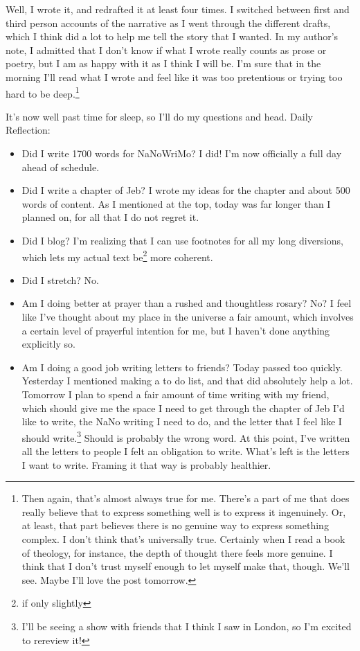 \documentclass[12pt]{article}[titlepage]
\newcommand{\1}{\={a}}
\newcommand{\2}{\={e}}
\newcommand{\3}{\={\i}}
\newcommand{\4}{\=o}
\newcommand{\5}{\=u}
\newcommand{\6}{\={A}}
\renewcommand{\,}{\textsuperscript{,}}
\begin{document}
Well, I wrote it, and redrafted it at least four times.
I switched between first and third person accounts of the narrative as I went through the different drafts, which I think did a lot to help me tell the story that I wanted.
In my author's note, I admitted that I don't know if what I wrote really counts as prose or poetry, but I am as happy with it as I think I will be.
I'm sure that in the morning I'll read what I wrote and feel like it was too pretentious or trying too hard to be deep.\footnote{Then again, that's almost always true for me.
There's a part of me that does really believe that to express something well is to express it ingenuinely.
Or, at least, that part believes there is no genuine way to express something complex.
I don't think that's universally true.
Certainly when I read a book of theology, for instance, the depth of thought there feels more genuine.
I think that I don't trust myself enough to let myself make that, though.
We'll see.
Maybe I'll love the post tomorrow.}

It's now well past time for sleep, so I'll do my questions and head.
Daily Reflection:
\begin{itemize}
\item Did I write 1700 words for NaNoWriMo? I did! I'm now officially a full day ahead of schedule.
\item Did I write a chapter of Jeb? I wrote my ideas for the chapter and about 500 words of content. As I mentioned at the top, today was far longer than I planned on, for all that I do not regret it.
\item Did I blog? I'm realizing that I can use footnotes for all my long diversions, which lets my actual text be\footnote{if only slightly} more coherent.
\item Did I stretch? No.
\item Am I doing better at prayer than a rushed and thoughtless rosary? No? I feel like I've thought about my place in the universe a fair amount, which involves a certain level of prayerful intention for me, but I haven't done anything explicitly so.
\item Am I doing a good job writing letters to friends? Today passed too quickly. Yesterday I mentioned making a to do list, and that did absolutely help a lot.
Tomorrow I plan to spend a fair amount of time writing with my friend, which should give me the space I need to get through the chapter of Jeb I'd like to write, the NaNo writing I need to do, and the letter that I feel like I should write.\footnote{I'll be seeing a show with friends that I think I saw in London, so I'm excited to rereview it!}
Should is probably the wrong word.
At this point, I've written all the letters to people I felt an obligation to write. What's left is the letters I want to write.
Framing it that way is probably healthier.
\end{itemize}
\end{document}
